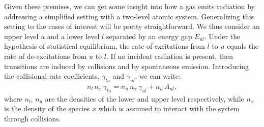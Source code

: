 Given these premises, we can get some insight into how a gas emits radiation by addressing a simplified setting with a two-level atomic system. Generalizing this setting to the cases of interest will be pretty straightforward. We thus consider an upper level $u$ and a lower level $l$ separated by an energy gap $E_{ul}$. Under the hypothesis of statistical equilibrium, the rate of excitations from $l$ to $u$ equals the rate of de-excitations from $u$ to $l$. If no incident radiation is present, then transitions are induced by collisions and by spontaneous emission. Introducing the collisional rate coefficients, $\gamma_{lu}$ and $\gamma_{ul}$, we can write:
\begin{align}
    n_l \,n_x\,\gamma_{lu} = n_u\,n_x\,\gamma_{ul} + n_u\,A_{ul}, \label{eq:level_eq}
\end{align}
where $n_l$, $n_u$ are the densities of the lower and upper level respectively, while $n_x$ is the density of the species $x$ which is assumed to interact with the system through collisions. 

